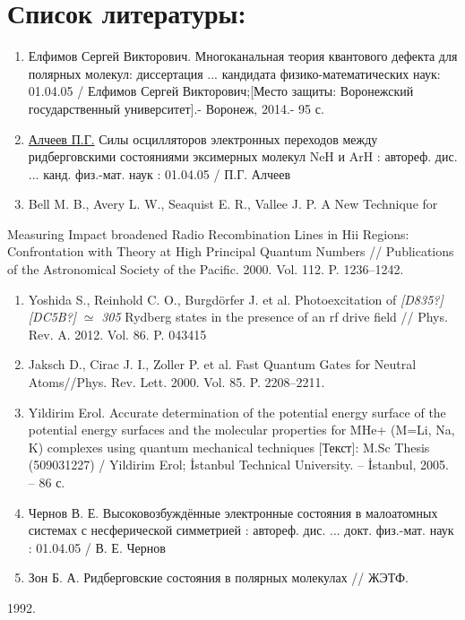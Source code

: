 \documentclass[a4paper]{article}
\newcounter{saveenum}
\newcommand\liststyleWWNumi{%
\renewcommand\theenumi{\arabic{enumi}}
\renewcommand\theenumii{\Roman{enumii}}
\renewcommand\theenumiii{\roman{enumiii}}
\renewcommand\theenumiv{\arabic{enumiv}}
\renewcommand\labelenumi{\theenumi.}
\renewcommand\labelenumii{\theenumii.}
\renewcommand\labelenumiii{\theenumiii.}
\renewcommand\labelenumiv{\theenumiv.}
}
\begin{document}
\clearpage\section[Список
литературы:]{Список
литературы:}
\hypertarget{RefHeading4709463868395}{}\liststyleWWNumi
\begin{enumerate}
\item Елфимов Сергей
Викторович. Многоканальная теория квантового дефекта для полярных молекул: диссертация ... кандидата физико-математических
наук: 01.04.05 / Елфимов
Сергей
Викторович;[Место
защиты: Воронежский государственный
университет].-
Воронеж, 2014.- 95 с. 
\item
\href{http://xn--90ax2c.xn--p1ai/search/?f_field%5bauthorbook%5d=f/authorbook/%D0%B0%D0%BB%D1%87%D0%B5%D0%B5%D0%B2+%D0%BF.%D0%B3.}{Алчеев П.Г.} Силы осцилляторов электронных переходов между ридберговскими состояниями эксимерных молекул NeH и ArH : автореф. дис. ... канд. физ.-мат. наук : 01.04.05 / П.Г. Алчеев
\item \foreignlanguage{english}{Bell M. B., Avery L. W., Seaquist E. R., Vallee J. P. A New Technique for}
\end{enumerate}
\foreignlanguage{english}{Measuring Impact broadened Radio Recombination Lines in Hii Regions: Confrontation with Theory
at High Principal Quantum Numbers // Publications of the Astronomical Society of the Pacific. 2000. Vol. 112. P.
1236--1242.}

\liststyleWWNumi
\setcounter{saveenum}{\value{enumi}}
\begin{enumerate}
\setcounter{enumi}{\value{saveenum}}
\item \foreignlanguage{english}{Yoshida S., Reinhold C. O., Burgd\"orfer J. et al. Photoexcitation of }\newline
\foreignlanguage{english}{\textit{[D835?][DC5B?]}}\foreignlanguage{english}{
}\foreignlanguage{english}{\textit{${\simeq}$}}\foreignlanguage{english}{
}\foreignlanguage{english}{\textit{305}}\foreignlanguage{english}{ Rydberg states in the presence of an rf drive field
// Phys. Rev. A. 2012. Vol. 86. P. 043415}
\item \foreignlanguage{english}{Jaksch D., Cirac J. I., Zoller P. et al. Fast Quantum Gates for Neutral Atoms//Phys.
Rev. Lett. 2000. Vol. 85. P. 2208--2211.}
\item \foreignlanguage{english}{Yildirim Erol. Accurate determination of the potential energy surface of the potential
energy surfaces and the molecular properties for MHe+ (M=Li, Na, K) complexes using quantum mechanical techniques
[}Текст\foreignlanguage{english}{]: M.Sc Thesis (509031227) / Yildirim Erol; \.Istanbul
Technical University. -- \.Istanbul, 2005. -- 86 }с\foreignlanguage{english}{.}
\item Чернов В. Е.
Высоковозбуждённые электронные состояния в малоатомных системах с несферической симметрией : автореф. дис. ... докт.
физ.-мат. наук : 01.04.05 / В. Е.
Чернов
\item Зон Б. А.
Ридберговские состояния в полярных
молекулах // ЖЭТФ.
\end{enumerate}
\foreignlanguage{english}{1992. }
\end{document}
